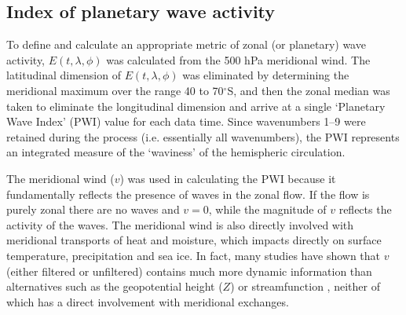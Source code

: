 \subsection{Index of planetary wave activity}

To define and calculate an appropriate metric of zonal (or planetary) wave activity, $E(t,\lambda,\phi)$ was calculated from the 500 hPa meridional wind. The latitudinal dimension of $E(t,\lambda,\phi)$ was eliminated by determining the meridional maximum over the range 40 to 70$^{\circ}$S, and then the zonal median was taken to eliminate the longitudinal dimension and arrive at a single `Planetary Wave Index' (PWI) value for each data time. Since wavenumbers 1--9 were retained during the process (i.e. essentially all wavenumbers), the PWI represents an integrated measure of the `waviness' of the hemispheric circulation.

The meridional wind ($v$) was used in calculating the PWI because it fundamentally reflects the presence of waves in the zonal flow. If the flow is purely zonal there are no waves and $v = 0$, while the magnitude of $v$ reflects the activity of the waves. The meridional wind is also directly involved with meridional transports of heat and moisture, which impacts directly on surface temperature, precipitation and sea ice. In fact, many studies have shown that $v$ (either filtered or unfiltered) contains much more dynamic information than alternatives such as the geopotential height ($Z$) or streamfunction \citep[e.g.][]{Berbery1996,Hoskins2005,Petoukhov2013}, neither of which has a direct involvement with meridional exchanges. 

